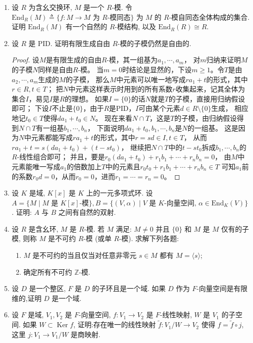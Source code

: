 \begin{enumerate}
\item 设 $ R $ 为含幺交换环, $ M $ 是一个 $ R $-模. 令 $ \mathrm{End}_R(M) \triangleq \{f : M \to M \text{ 为 } R\text{-模同态}\} $ 为 $ M $ 的 $ R $-模自同态全体构成的集合. 证明 $ \mathrm{End}_R(M) $ 有一个自然的 $ R $-模结构, 以及 $ \mathrm{End}_R(R) \cong R $.

\item 设 $ R $ 是 PID. 证明有限生成自由 $ R $-模的子模仍然是自由的.
\begin{proof}
    设$M$是有限生成的自由$R$-模，其一组基为$a_1,\cdots,a_m$，
    对$m$归纳来证明$M$的子模$N$同样是自由$R$-模。
    当$m=0$时结论是显然的，下设$m\geqslant1$。令$T$是由$a_2,\cdots,a_m$生成的$M$的子模，
    那么$M$中元素可以唯一地写成$ra_1+t$的形式，其中$r \in R,t \in T$；
    把$N$中元素这样表示时用到的所有系数$r$收集起来，记其全体为集合$I$，易见$I$是$R$的理想。
    如果$I=\{0\}$的话$N$就是$T$的子模，直接用归纳假设即可；
    下设$I$不止是$\{0\}$，由于$R$是PID，$I$可由某个元素$d \in R\setminus\{0\}$生成，
    相应地记$t_0 \in T$使得$da_1+t_0 \in N$。
    现在来看$N \cap T$，这是$T$的子模，由归纳假设得到$N \cap T$有一组基$b_1,\cdots,b_n$，
    下面说明$da_1+t_0,b_1,\cdots,b_n$是$N$的一组基。
    这是因为$N$中元素都能写成$ra_1+t$的形式，其中$r=sd \in I,t \in T$，
    从而$ra_1+t=s(da_1+t_0)+(t-st_0)$，
    继续把$N \cap T$中的$t-st_0$拆成$b_1,\cdots,b_n$的$R$-线性组合即可；
    并且，要是$r_0(da_1+t_0)+r_1b_1+\cdots+r_nb_n=0$，
    由$M$中元素能唯一写成$a_1$的倍数加上$T$中的元素且$r_0t_0+r_1b_1+\cdots+r_nb_n \in T$
    可知$a_1$前的系数$r_0d=0$，从而$r_0=0$，进而$r_1=\cdots=r_n=0$。
\end{proof}
\item 设 $ K $ 是域, $ K[x] $ 是 $ K $ 上的一元多项式环. 设 $ A = \{M \mid M \text{ 是 } K[x] \text{-模}\}, B = \{(V, \alpha) \mid V \text{ 是 } K \text{-向量空间, } \alpha \in \mathrm{End}_K(V)\} $. 证明: $ A $ 与 $ B $ 之间有自然的双射.

\item 设 $ R $ 是含幺环, $ M $ 是 $ R $-模. 若 $ M $ 满足: $ M \neq 0 $ 并且 $\{0\}$ 和 $ M $ 是 $ M $ 仅有的子模, 则称 $ M $ 是不可约 $ R $-模 (或单 $ R $-模). 求解下列各题:
\begin{enumerate}[label=(\arabic*)]
    \item $ M $ 是不可约的当且仅当对任意非零元 $ s \in M $ 都有 $ M = \langle s\rangle $;
    \item 确定所有不可约 $ \mathbb{Z} $-模.
\end{enumerate}

\item 设 $ D $ 是一个整区, $ F $ 是 $ D $ 的子环且是一个域.
如果 $ D $ 作为 $ F $-向量空间是有限维的,证明 $ D $ 是一个域.

\item 设 $ F $ 是域, $ V_1, V_2 $ 是 $ F $-向量空间, 
$ f : V_1 \to V_2 $ 是 $ F $-线性映射, $ W $ 是 $ V_1 $ 的子空间.
如果 $ W \subset \operatorname{Ker} f $,
证明:存在唯一的线性映射 $ \tilde{f} : V_1 / W \to V_2 $ 
使得 $ f = \tilde{f} \circ j $,这里 $ j : V_1 \to V_1 / W $ 是商映射.

\end{enumerate}

